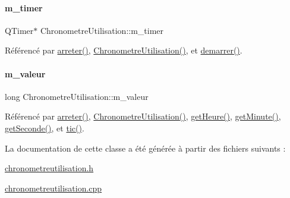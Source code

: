 \paragraph{\texorpdfstring{m\+\_\+timer}{m\_timer}}
{\footnotesize\ttfamily Q\+Timer$\ast$ Chronometre\+Utilisation\+::m\+\_\+timer\hspace{0.3cm}{\ttfamily [private]}}



Référencé par \hyperlink{class_chronometre_utilisation_a938c4c86a6b33eaf60af7be81ee7ec32}{arreter()}, \hyperlink{class_chronometre_utilisation_a499bd70e5056ddb71df022848d1e345e}{Chronometre\+Utilisation()}, et \hyperlink{class_chronometre_utilisation_ac3f2fb837e9ba408d4dcaf488b289c64}{demarrer()}.

\mbox{\label{class_chronometre_utilisation_a7ef8b30ae4b6db56b9be832c847186ea}} 
\paragraph{\texorpdfstring{m\+\_\+valeur}{m\_valeur}}
{\footnotesize\ttfamily long Chronometre\+Utilisation\+::m\+\_\+valeur\hspace{0.3cm}{\ttfamily [private]}}



Référencé par \hyperlink{class_chronometre_utilisation_a938c4c86a6b33eaf60af7be81ee7ec32}{arreter()}, \hyperlink{class_chronometre_utilisation_a499bd70e5056ddb71df022848d1e345e}{Chronometre\+Utilisation()}, \hyperlink{class_chronometre_utilisation_a03c732560e07a2014129a7da8bb2307b}{get\+Heure()}, \hyperlink{class_chronometre_utilisation_a2c137076fcda83a14a5bad01b915196f}{get\+Minute()}, \hyperlink{class_chronometre_utilisation_a62dde8f710b8e015ba6124e8b44fe2da}{get\+Seconde()}, et \hyperlink{class_chronometre_utilisation_ab8dc7eb855ec9e24daefa4e185051d2e}{tic()}.



La documentation de cette classe a été générée à partir des fichiers suivants \+:\begin{DoxyCompactItemize}
\item 
\hyperlink{chronometreutilisation_8h}{chronometreutilisation.\+h}\item 
\hyperlink{chronometreutilisation_8cpp}{chronometreutilisation.\+cpp}\end{DoxyCompactItemize}
